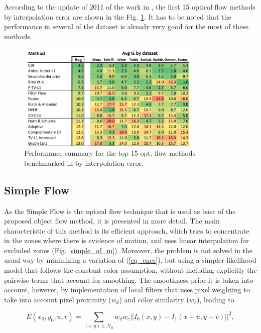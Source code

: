 According to the update of 2011 of the work in \cite{c17}, the first 15 optical flow methods by interpolation error are shown in the Fig. \ref{of_per}. It has to be noted that the performance in several of the dataset is already very good for the most of these methods.

   \begin{figure}[thpb]
      \centering
      \includegraphics[width=0.8\textwidth]{../images/of_performance.png}
      \caption{ Performance summary for the top 15 opt. flow methods benchmarked in \cite{c17} by interpolation error. }
      \label{of_per}
   \end{figure}

\subsection{Simple Flow}

As the Simple Flow \cite{c21} is the optical flow technique that is used as base of the proposed 
object flow method, it is presented in more detail. 
The main characteristic of this method is its efficient approach, which tries to concentrate in the zones where there is evidence of motion, and uses linear 
interpolation for excluded zones (Fig. \ref{simple_of_m}). 
Moreover, the problem is not solved in the usual way by minimizing a variation of (\ref{eq_ener}), but using a simpler likelihood model that 
follows the constant-color assumption, without including explicitly the pairwise terms that account for smoothing. The smoothness prior it is taken into 
account, however, by implementation of local filters that uses pixel weighting to take into account pixel proximity ($w_d$) and color similarity ($w_c$), leading to

\begin{equation}
E(x_0, y_0, u, v) = \sum_{(x,y) \in \mathcal{N}_{0}} w_{d}w_{c}||  I_{0}(x,y) - I_{1}(x+u,y+v) ||^2,
\label{eq_simple}
\end{equation}

